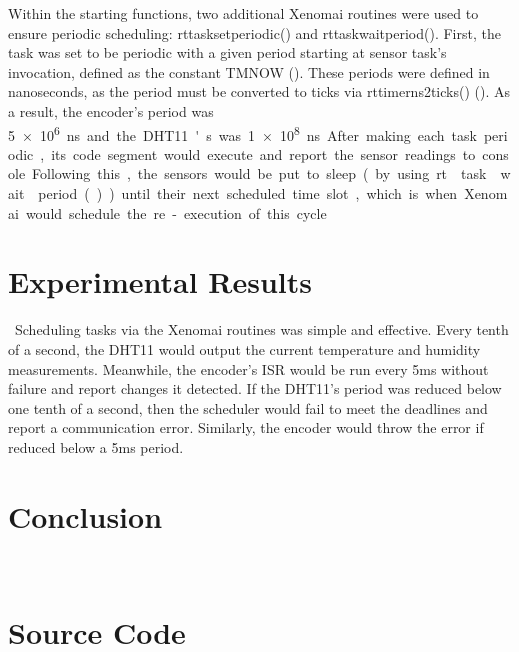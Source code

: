\documentclass[letterpaper, 12pt]{article}
\begin{document}
\indent Within the starting functions, two additional Xenomai routines were used to ensure periodic scheduling: rt\textunderscore task\textunderscore set\textunderscore periodic() and rt\textunderscore task\textunderscore wait\textunderscore period().  First, the task was set to be periodic with a given period starting at sensor task's invocation, defined as the constant TM\textunderscore NOW (\cite{xenomai2018}).  These periods were defined in nanoseconds, as the period must be converted to ticks via rt\textunderscore timer\textunderscore ns2ticks() (\cite{xenomai2018}).  As a result, the encoder's period was \SI{5e6} ns and the DHT11's was \SI{1e8} ns.  After making each task periodic, its code segment would execute and report the sensor readings to console.  Following this, the sensors would be put to sleep (by using rt\textunderscore task\textunderscore wait\textunderscore period()) until their next scheduled time slot, which is when Xenomai would schedule the re-execution of this cycle.

~\newpage
\section{Experimental Results}
~\indent Scheduling tasks via the Xenomai routines was simple and effective.  Every tenth of a second, the DHT11 would output the current temperature and humidity measurements.  Meanwhile, the encoder's ISR would be run every 5ms without failure and report changes it detected.  If the DHT11's period was reduced below one tenth of a second, then the scheduler would fail to meet the deadlines and report a communication error.  Similarly, the encoder would throw the error if reduced below a 5ms period.  

\section{Conclusion}

~\newpage
\printbibliography
~\newpage
\section{Source Code}

\end{document}
